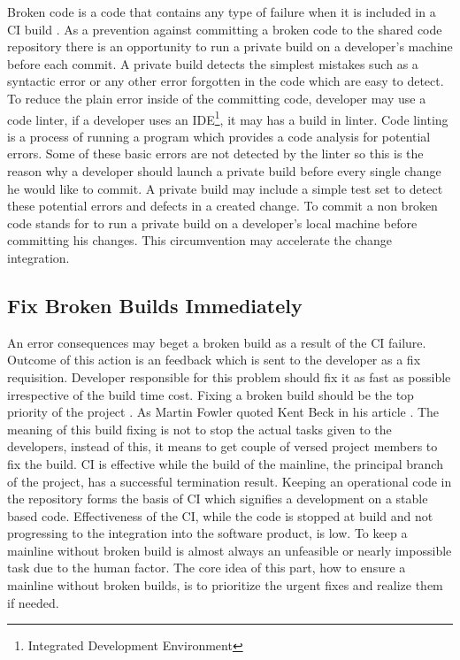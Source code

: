 Broken code is a code that contains any type of failure when it is included in a CI build \cite{CIQualityFramework}. As a prevention against committing a broken code to the shared code repository there is an opportunity to run a private build on a developer's machine before each commit. A private build detects the simplest mistakes such as a syntactic error or any other error forgotten in the code which are easy to detect. To reduce the plain error inside of the committing code, developer may use a code linter, if a developer uses an IDE\footnote{Integrated Development Environment}, it may has a build in linter. Code linting is a process of running a program which provides a code analysis for potential errors. Some of these basic errors are not detected by the linter so this is the reason why a developer should launch a private build before every single change he would like to commit. A private build may include a simple test set to detect these potential errors and defects in a created change. To commit a non broken code stands for to run a private build on a developer's local machine before committing his changes. This circumvention may accelerate the change integration.

\subsection{Fix Broken Builds Immediately}

An error consequences may beget a broken build as a result of the CI failure. Outcome of this action is an feedback which is sent to the developer as a fix requisition. Developer responsible for this problem should fix it as fast as possible irrespective of the build time cost. Fixing a broken build should be the top priority of the project \cite{CIQualityFramework}. As Martin Fowler quoted Kent Beck in his article  \cite{MartinFowler}. The meaning of this build fixing is not to stop the actual tasks given to the developers, instead of this, it means to get couple of versed project members to fix the build. CI is effective while the build of the mainline, the principal branch of the project, has a successful termination result. Keeping an operational code in the repository forms the basis of CI which signifies a development on a stable based code. Effectiveness of the CI, while the code is stopped at build and not progressing to the integration into the software product, is low. To keep a mainline without broken build is almost always an unfeasible or nearly impossible task due to the human factor. The core idea of this part, how to ensure a mainline without broken builds, is to prioritize the urgent fixes and realize them if needed.\\

